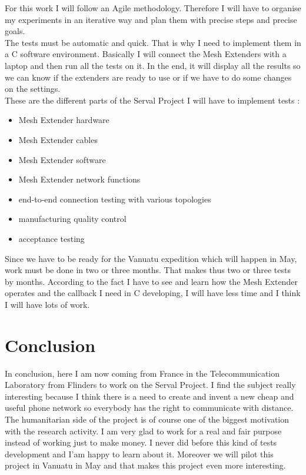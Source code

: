 \documentclass[a4paper, 11pt, oneside]{Thesis}  %
\begin{document}
For this work I will follow an Agile methodology. Therefore I will have to organise my experiments in an iterative way and plan them with precise steps and precise goals.  \\
The tests must be automatic and quick. That is why I need to implement them in a C software environment. Basically I will connect the Mesh Extenders with a laptop and then run all the tests on it. In the end, it will display all the results so we can know if the extenders are ready to use or if we have to do some changes on the settings. \\
These are the different parts of the Serval Project I will have to implement tests : 
\begin{itemize}
\item Mesh Extender hardware 
\item Mesh Extender cables
\item Mesh Extender software 
\item Mesh Extender network functions
\item end-to-end connection testing with various topologies
\item manufacturing quality control 
\item acceptance testing
\end{itemize}
Since we have to be ready for the Vanuatu expedition which will happen in May, work must be done in two or three months. That makes thus two or three tests by months. According to the fact I have to see and learn how the Mesh Extender operates and  the callback I need in C developing, I will have less time and I think I will have lots of work. 

\chapter{Conclusion}
In conclusion, here I am now coming from France in the Telecommunication Laboratory from Flinders to work on the Serval Project. I find the subject really interesting because I think there is a need to create and invent a new cheap and useful phone network so everybody has the right to communicate with distance. The humanitarian side of the project is of course one of the biggest motivation with the research activity. I am very glad to work for a real and fair purpose instead of working just to make money. I never did before this kind of tests development and I'am happy to learn about it. Moreover we will pilot this project in Vanuatu in May and that makes this project even more interesting. 
\end{document}

